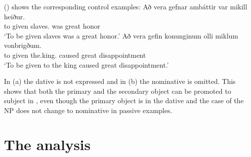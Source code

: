 \noindent
() shows the corresponding control examples:
\eal
\ex
\gll Að vera gefnar ambáttir var mikill heiður.\\
     to \AUX{} given slaves.\NOM{} was great honor\\\icelandic
\glt `To be given slaves was a great honor.'
\ex
\gll Að vera gefin konunginum olli miklum vonbrigðum.\\
     to \AUX{} given the.king.\DAT{} caused great disappointment\\
\glt `To be given to the king caused great disappointment.'

\zl
In (a) the dative is not expressed and in (b) the nominative is omitted. This shows
that both the primary and the secondary object can be promoted to subject in , even though
the primary object is in the dative and the case of the NP does not change to nominative in passive examples.














\section{The analysis}

